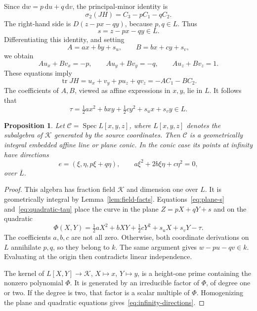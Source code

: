 \documentclass[11pt,reqno]{amsart}
\newtheorem{proposition}[theorem]{Proposition}
\theoremstyle{definition}
\theoremstyle{remark}
\numberwithin{equation}{section}
\DeclareMathOperator{\Spec}{Spec}
\DeclareMathOperator{\tr}{tr}
\newcommand{\dd}{\mathrm d}
\begin{document}
Since $\dd w=p\,\dd u+q\,\dd v$, the principal-minor identity is
\begin{equation}\label{eq:plane-sigma}
 \sigma_2(JH)=C_3-pC_1-qC_2.
\end{equation}
The right-hand side is $D(z-px-qy)$, because $p,q\in L$. Thus
\begin{equation}\label{eq:plane-s}
 s=z-px-qy\in L.
\end{equation}
Differentiating this identity, and setting
\[
 A=ax+by+s_u,\qquad B=bx+cy+s_v,
\]
we obtain
\begin{equation}\label{eq:plane-differentials}
 Au_x+Bv_x=-p,\qquad Au_y+Bv_y=-q,\qquad Au_z+Bv_z=1.
\end{equation}
These equations imply
\[
 \tr JH=u_x+v_y+pu_z+qv_z=-AC_1-BC_2.
\]
The coefficients of $A,B$, viewed as affine expressions in $x,y$, lie in $L$. It follows that
\begin{equation}\label{eq:quadratic-tau}
 \tau=\tfrac12ax^2+bxy+\tfrac12cy^2+s_ux+s_vy\in L.
\end{equation}

\begin{proposition}\label{prop:line-conic}
Let $\mathcal C=\Spec L[x,y,z]$, where $L[x,y,z]$ denotes the subalgebra of $\mathcal K$ generated by the source coordinates. Then $\mathcal C$ is a geometrically integral embedded affine line or plane conic. In the conic case its points at infinity have directions
\begin{equation}\label{eq:infinity-directions}
 e=(\xi,\eta,p\xi+q\eta),\qquad a\xi^2+2b\xi\eta+c\eta^2=0,
\end{equation}
over $\overline L$.
\end{proposition}

\begin{proof}
This algebra has fraction field $\mathcal K$ and dimension one over $L$. It is geometrically integral by Lemma~\ref{lem:field-facts}. Equations~\eqref{eq:plane-s} and~\eqref{eq:quadratic-tau} place the curve in the plane $Z=pX+qY+s$ and on the quadratic
\[
 \Phi(X,Y)=\tfrac12aX^2+bXY+\tfrac12cY^2+s_uX+s_vY-\tau.
\]
The coefficients $a,b,c$ are not all zero. Otherwise, both coordinate derivations on $L$ annihilate $p,q$, so they belong to $k$. The same argument gives $w-pu-qv\in k$. Evaluating at the origin then contradicts linear independence.

The kernel of $L[X,Y]\to \mathcal K$, $X\mapsto x$, $Y\mapsto y$, is a height-one prime containing the nonzero polynomial $\Phi$. It is generated by an irreducible factor of $\Phi$, of degree one or two. If the degree is two, that factor is a scalar multiple of $\Phi$. Homogenizing the plane and quadratic equations gives~\eqref{eq:infinity-directions}.
\end{proof}
\end{document}
